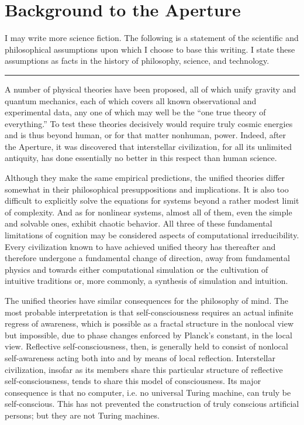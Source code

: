 \documentclass[english,11pt,letterpaper,onecolumn]{scrbook}
\begin{document}
\chapter{Background to the Aperture}

	I may write more science fiction.  The following is a statement of the scientific and philosophical assumptions upon which I choose to base this writing.  I state these assumptions as facts in the history of philosophy, science, and technology.

\begin{center}\rule[3pt]{2in}{0.5pt}\end{center}

	A number of physical theories have been proposed, all of which unify gravity and quantum mechanics, each of which covers all known observational and experimental data, any one of which may well be the ``one true theory of everything.''  To test these theories decisively would require truly cosmic energies and is thus beyond human, or for that matter nonhuman, power.  Indeed, after the Aperture, it was discovered that interstellar civilization, for all its unlimited antiquity, has done essentially no better in this respect than human science.

	Although they make the same empirical predictions, the unified theories differ somewhat in their philosophical presuppositions and implications.  It is also too difficult to explicitly solve the equations for systems beyond a rather modest limit of complexity.  And as for nonlinear systems, almost all of them, even the simple and solvable ones, exhibit chaotic behavior.  All three of these fundamental limitations of cognition may be considered aspects of computational irreducibility.  Every civilization known to have achieved unified theory has thereafter and therefore undergone a fundamental change of direction, away from fundamental physics and towards either computational simulation or the cultivation of intuitive traditions or, more commonly, a synthesis of simulation and intuition.

	The unified theories have similar consequences for the philosophy of mind.  The most probable interpretation is that self-consciousness requires an actual infinite regress of awareness, which is possible as a fractal structure in the nonlocal view but impossible, due to phase changes enforced by Planck's constant, in the local view.  Reflective self-consciousness, then, is generally held to consist of nonlocal self-awareness acting both into and by means of local reflection.  Interstellar civilization, insofar as its members share this particular structure of reflective self-consciousness, tends to share this model of consciousness.  Its major consequence is that no computer, i.e. no universal Turing machine, can truly be self-conscious.  This has not prevented the construction of truly conscious artificial persons; but they are not Turing machines.  
\end{document}
